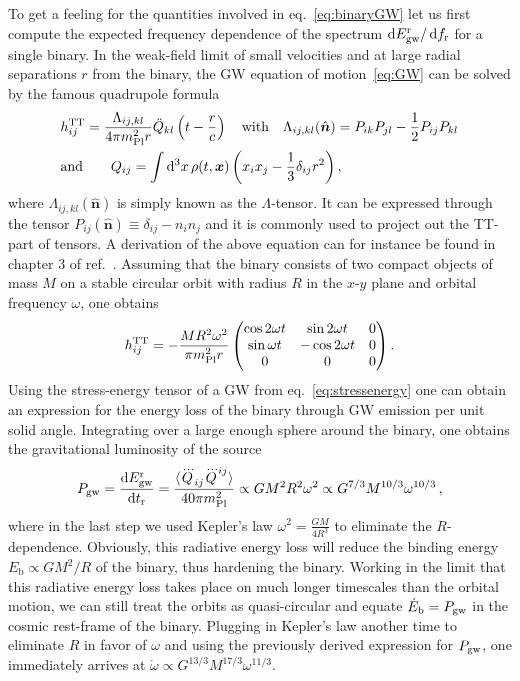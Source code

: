 To get a feeling for the quantities involved in eq.~\eqref{eq:binaryGW} let us first compute the expected frequency dependence of the spectrum $\mathop{}\!\mathrm{d} E_{\text{gw}}^\text{r} / \mathop{}\!\mathrm{d} f_\text{r}$ for a single binary. In the weak-field limit of small velocities and at large radial separations $r$ from the binary, the  \ac{GW} equation of motion~\eqref{eq:GW} can be solved by the famous quadrupole formula~\cite{Maggiore:2007ulw}
\begin{align}
	&h_{ij}^{\text{TT}}= \frac{\Lambda_{ij, kl}}{4 \pi m_\text{Pl}^2 r}  \ddot{Q}_{kl}\left( t-\frac{r}{c} \right) \quad \text{with}  \quad \Lambda_{ij,kl}(\hat{\bm{n}}) = P_{ik} P_{jl} - \frac{1}{2}P_{ij} P_{kl} \nonumber \\ &\text{and}
	\qquad Q_{ij} = \int \mathop{}\!\mathrm{d}^3 x \, \rho(t, \bm{x}) \left( x_i x_j - \frac{1}{3} \delta_{ij} r^2 \right) ,
\end{align}
where $\Lambda_{ij,kl}(\hat{\bm{n}})$ is simply known as the $\Lambda$-tensor. It can be expressed through the tensor $P_{ij}(\hat{\bm{n}}) \equiv \delta_{ij} - n_i n_j$ and it is commonly used to project out the \ac{TT}-part of tensors. A derivation of the above equation can for instance be found in chapter 3 of ref.~\cite{Maggiore:2007ulw}. Assuming that the binary consists of two compact objects of mass $M$ on a stable circular orbit with  radius $R$ in the $x$-$y$ plane and orbital frequency $\omega$, one obtains
\begin{align}
	h_{ij}^{\text{TT}} = - \frac{M R^2 \omega^2}{\pi m_\text{Pl}^2 r} \begin{pmatrix}
		\cos 2 \omega t & \sin 2 \omega t &0\\
		\sin \omega t &- \cos 2 \omega t &0\\ 
		0 &0 &0
	\end{pmatrix} . \label{eq:GWbinary}
\end{align}
Using the stress-energy tensor of a \ac{GW} from eq.~\eqref{eq:stressenergy} one can obtain an expression for the energy loss of the binary through \ac{GW} emission per unit solid angle.  Integrating over a large enough sphere around the binary, one obtains the gravitational luminosity of the source
\begin{align}
	P_\text{gw} = \frac{\mathrm d E_{\text{gw}}^\text{r}}{\mathrm d t_\text{r}} = \frac{\langle \dddot{Q}_{ij} \dddot{Q}^{ij} \rangle }{40 \pi m_\text{Pl}^2}  \propto G M^2 R^2 \omega^2 \propto G^{7/3} M^{10/3} \omega^{10/3} \, ,
\end{align}
where in the last step we used Kepler's law $\omega^2 = \frac{GM}{4 R^3}$ to eliminate the $R$-dependence. Obviously, this radiative energy loss will reduce the binding energy $E_\text{b} \propto G M^2 / R$ of the binary, thus hardening the binary. Working in the limit that this radiative energy loss takes place on much longer timescales than the orbital motion, we can still treat the orbits as quasi-circular and equate $\dot{E}_\text{b} = P_{\text{gw}}$ in the cosmic rest-frame of the binary. Plugging in Kepler's law another time to eliminate $R$ in favor of $\omega$ and using the previously derived expression for $P_{\text{gw}}$, one immediately arrives at $\dot{\omega} \propto G^{13/3} M^{17/3} \omega^{11/3}$.

